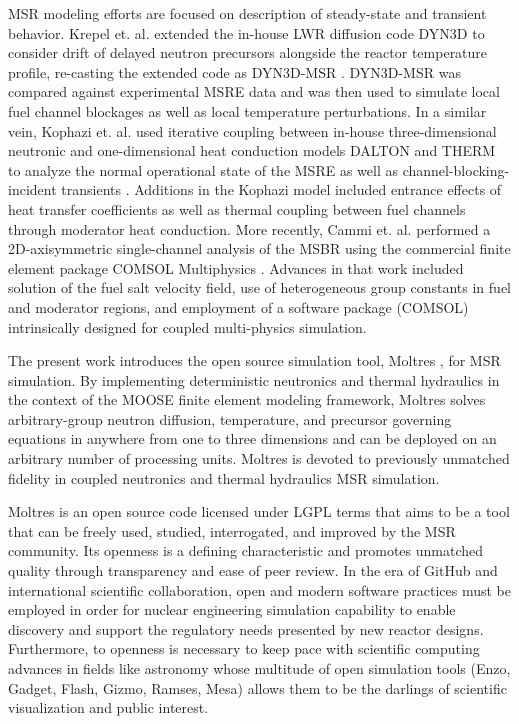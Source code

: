 \documentclass{article}
\begin{document}
\gls{MSR} modeling efforts are focused on description of steady-state and
transient behavior. Krepel et. al. extended the in-house \gls{LWR}
diffusion code DYN3D to consider drift of delayed neutron precursors alongside
the reactor temperature profile, re-casting the extended code as
DYN3D-MSR \cite{krepel_dyn3d-msr_2007}. DYN3D-MSR was compared against
experimental \gls{MSRE} data and was then used to simulate local fuel channel
blockages as well as local temperature perturbations. In a similar vein, Kophazi
et. al. used iterative coupling between in-house three-dimensional neutronic and
one-dimensional heat conduction models DALTON and THERM to analyze the normal
operational state of the \gls{MSRE} as well as channel-blocking-incident
transients \cite{kophazi_development_2009}. Additions in the Kophazi model
included entrance effects of heat transfer coefficients as well as thermal
coupling between fuel channels through moderator heat conduction. More recently,
Cammi et. al. performed a 2D-axisymmetric single-channel analysis of the
\gls{MSBR} using the commercial finite element package COMSOL
Multiphysics \cite{cammi_multi-physics_2011}. Advances in that work included
solution of the fuel salt velocity field, use of heterogeneous group constants
in fuel and moderator regions, and employment of a software package (COMSOL)
intrinsically designed for coupled multi-physics simulation.

The present work introduces the open source simulation tool, Moltres 
\cite{lindsay_arfc/moltres_nodate}, for \gls{MSR} simulation.  By implementing 
deterministic neutronics and thermal hydraulics in the context of the 
\gls{MOOSE} finite element modeling framework, Moltres solves arbitrary-group 
neutron diffusion, temperature, and precursor governing equations in anywhere 
from one to three dimensions and can be deployed on an arbitrary number of 
processing units. Moltres is devoted to previously unmatched 
fidelity in coupled neutronics and thermal hydraulics \gls{MSR} simulation. 

Moltres is an open source code licensed under \gls{LGPL} terms that aims to be a tool that can be
freely used, studied, interrogated, and improved by the \gls{MSR}
community.  Its openness is a defining characteristic and 
promotes unmatched quality through transparency and ease of peer review. In the
era of GitHub\cite{github} and international scientific collaboration, open and modern software practices must be
employed in order for nuclear engineering simulation capability to enable 
discovery and support the regulatory needs presented by new reactor designs. 
Furthermore, to openness is necessary to keep pace with scientific computing 
advances in fields like astronomy whose multitude of open simulation tools
(Enzo\cite{enzo}, Gadget\cite{gadget}, Flash\cite{flash}, Gizmo\cite{gizmo}, 
Ramses\cite{ramses}, Mesa\cite{mesa}) allows them to be the darlings of
scientific visualization and public interest. 
\end{document}
